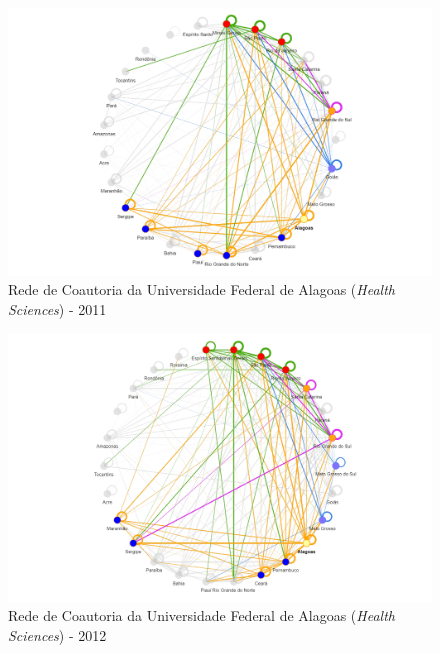 \begin{figure}[H]
	\centering
	\includegraphics[width=\linewidth]{Imagens/rede-al-2011.pdf}
	\caption{Rede de Coautoria da Universidade Federal de Alagoas (\textit{Health Sciences}) - 2011}
	\label{Rede de Coautoria - UF AL 2011}
\end{figure}


\begin{figure}[H]
	\centering
	\includegraphics[width=\linewidth]{Imagens/rede-al-2012.pdf}
	\caption{Rede de Coautoria da Universidade Federal de Alagoas (\textit{Health Sciences}) - 2012}
	\label{Rede de Coautoria - UF AL 2012}
\end{figure}

